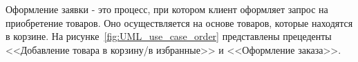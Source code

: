 

Оформление заявки - это процесс, при котором клиент оформляет запрос на приобретение товаров.
Оно осуществляется на основе товаров, которые находятся в корзине.
На рисунке~\ref{fig:UML_use_case_order} представлены прецеденты <<Добавление товара в корзину/в избранные>>
и <<Оформление заказа>>.




